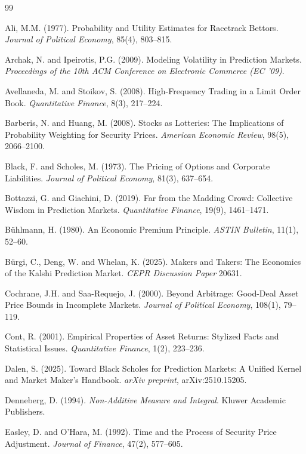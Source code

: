 \documentclass[12pt,a4paper]{article}
\begin{document}
\begin{thebibliography}{99}
\small

 Ali, M.M. (1977). Probability and Utility Estimates for Racetrack
  Bettors. \emph{Journal of Political Economy}, 85(4), 803--815.

 Archak, N. and Ipeirotis, P.G. (2009). Modeling Volatility in
  Prediction Markets. \emph{Proceedings of the 10th ACM Conference on
  Electronic Commerce (EC '09)}.

 Avellaneda, M. and Stoikov, S. (2008). High-Frequency Trading in a
  Limit Order Book. \emph{Quantitative Finance}, 8(3), 217--224.

 Barberis, N. and Huang, M. (2008). Stocks as Lotteries: The
  Implications of Probability Weighting for Security Prices.
  \emph{American Economic Review}, 98(5), 2066--2100.

 Black, F. and Scholes, M. (1973). The Pricing of Options and Corporate
  Liabilities. \emph{Journal of Political Economy}, 81(3), 637--654.

 Bottazzi, G. and Giachini, D. (2019). Far from the Madding Crowd:
  Collective Wisdom in Prediction Markets. \emph{Quantitative Finance},
  19(9), 1461--1471.

 Bühlmann, H. (1980). An Economic Premium Principle. \emph{ASTIN
  Bulletin}, 11(1), 52--60.

 Bürgi, C., Deng, W. and Whelan, K. (2025). Makers and Takers: The
  Economics of the Kalshi Prediction Market. \emph{CEPR Discussion
  Paper} 20631.

 Cochrane, J.H. and Saa-Requejo, J. (2000). Beyond Arbitrage: Good-Deal
  Asset Price Bounds in Incomplete Markets. \emph{Journal of Political
  Economy}, 108(1), 79--119.

 Cont, R. (2001). Empirical Properties of Asset Returns: Stylized Facts
  and Statistical Issues. \emph{Quantitative Finance}, 1(2), 223--236.

 Dalen, S. (2025). Toward Black Scholes for Prediction Markets: A
  Unified Kernel and Market Maker's Handbook. \emph{arXiv preprint},
  arXiv:2510.15205.

 Denneberg, D. (1994). \emph{Non-Additive Measure and Integral}. Kluwer
  Academic Publishers.

 Easley, D. and O'Hara, M. (1992). Time and the Process of Security
  Price Adjustment. \emph{Journal of Finance}, 47(2), 577--605.


\end{thebibliography}
\end{document}
